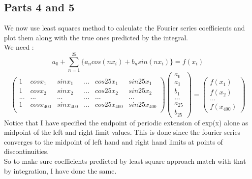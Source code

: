 \documentclass[11pt, a4paper]{article}
\begin{document}
\subsection{Parts 4 and 5}
We now use least squares method to calculate the Fourier series coefficients and plot them along with the true ones predicted by the integral.
\\
We need :
\begin{equation}\label{eq:fs2}
a_0 + \sum_{n=1}^{25} \{a_n cos(nx_i) + b_n sin(nx_i)\} = f(x_i)
\end{equation}
\begin{equation}\label{eq:2}
\begin{pmatrix}
1 & cosx_1 & sinx_1 & ... & cos25x_1 & sin25x_1 \\
1 & cosx_2 & sinx_2 & ... & cos25x_2 & sin25x_2 \\
... & ... & ... & ... & ... & ... \\
1 & cosx_{400} & sinx_{400 }& ... & cos25x_{400} & sin25x_{400} \\
\end{pmatrix}
\begin{pmatrix}
a_0 \\ a_1 \\ b_1 \\ ... \\ a_{25} \\ b_{25}
\end{pmatrix}
=
\begin{pmatrix}
f(x_1) \\ f(x_2) \\ ... \\ f(x_{400})
\end{pmatrix}
\end{equation}
Notice that  I have specified the endpoint of periodic extension of exp(x) alone as midpoint of the left
and right limit values. This is done since the fourier series converges to the midpoint of left hand and 
right hand limits at points of discontinuities. 
\\
So to make sure coefficients predicted by least square approach match with that by integration, I have done the same.
\end{document}
